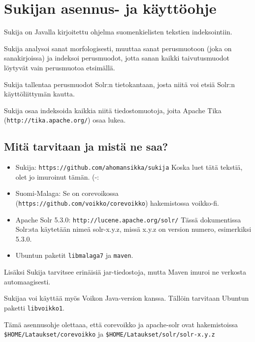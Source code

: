 \documentclass[12pt]{article}
\begin{document}
\pagestyle{fancy}
\setlength{\parindent}{0pt}
\setlength{\parskip}{1ex plus 0.5ex minus 0.2ex}
\section*{Sukijan asennus- ja käyttöohje}


Sukija on Javalla kirjoitettu ohjelma suomenkielisten tekstien
indeksointiin.

Sukija analysoi sanat morfologisesti, muuttaa sanat perusmuotoon (joka
on sanakirjoissa) ja indeksoi perusmuodot, jotta sanan kaikki
taivutusmuodot löytyvät vain perusmuotoa etsimällä.

Sukija tallentaa perusmuodot Solr:n tietokantaan, josta niitä voi
etsiä Solr:n käyttöliittymän kautta.

Sukija osaa indeksoida kaikkia niitä tiedostomuotoja, joita Apache
Tika (\verb=http://tika.apache.org/=) osaa lukea.

\subsection*{Mitä tarvitaan ja mistä ne saa?}

\begin{itemize}

\item Sukija:
      \verb=https://github.com/ahomansikka/sukija=
      Koska luet tätä tekstiä, olet jo imuroinut tämän. (-:

\item Suomi-Malaga: Se on corevoikossa
      (\verb=https://github.com/voikko/corevoikko=)
      hakemistossa voikko-fi.

\item Apache Solr 5.3.0:
      \verb=http://lucene.apache.org/solr/=
      Tässä dokumentissa Solr:sta käytetään nimeä solr-x.y.z,
      missä x.y.z on version numero, esimerkiksi 5.3.0.

\item Ubuntun paketit \verb=libmalaga7= ja \verb=maven=.
\end{itemize}

Lisäksi Sukija tarvitsee erinäisiä jar-tiedostoja, mutta Maven imuroi
ne verkosta automaagisesti.

Sukijaa voi käyttää myös Voikon Java-version kanssa. Tällöin tarvitaan
Ubuntun paketti \verb=libvoikko1=.

Tämä asennusohje olettaaa, että corevoikko ja apache-solr ovat hakemistoissa
\verb=$HOME/Lataukset/corevoikko= ja
\verb=$HOME/Lataukset/solr/solr-x.y.z=
\end{document}
